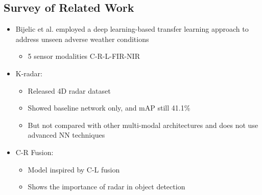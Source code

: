 \documentclass[rnd]{mas_proposal}
\begin{document}
\subsection{Survey of Related Work}
\begin{itemize}
    \item Bijelic et al. employed a deep learning-based transfer learning approach to address unseen adverse weather conditions
    \cite{bijelic2020seeing}
    \begin{itemize}
        \item 5 sensor modalities C-R-L-FIR-NIR
    \end{itemize}
    
    \item K-radar: 
    \cite{Paek2022Jun}
    \begin{itemize}
        \item Released 4D radar dataset
        \item Showed baseline network only, and mAP still 41.1\%
        \item But not compared with other multi-modal architectures and does not use advanced NN techniques 
    \end{itemize}
        
    
    \item C-R Fusion:
    \cite{Nobis2020May}
    \begin{itemize}
        \item Model inspired by C-L fusion
        \item Shows the importance of radar in object detection
    \end{itemize}    
    
    
\end{itemize}
\end{document}
